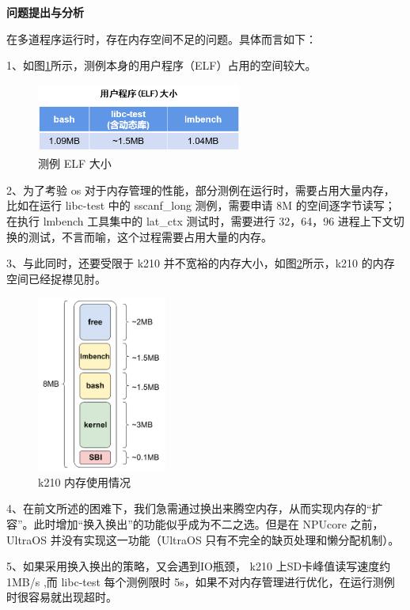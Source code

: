 \textbf{问题提出与分析}

在多道程序运行时，存在内存空间不足的问题。具体而言如下：

1、如图\ref{fig:ELF}所示，测例本身的用户程序（ELF）占用的空间较大。

\begin{figure}[H]
	\centering
	\includegraphics[width=0.6\textwidth]{figures/10-04-测例ELF.jpg}
	\caption{测例 ELF 大小}
	\label{fig:ELF}
\end{figure}

2、为了考验 os 对于内存管理的性能，部分测例在运行时，需要占用大量内存，比如在运行 libc-test 中的 sscanf_long 测例，需要申请 8M 的空间逐字节读写；在执行 lmbench 工具集中的 lat_ctx 测试时，需要进行 32，64，96 进程上下文切换的测试，不言而喻，这个过程需要占用大量的内存。

3、与此同时，还要受限于 k210 并不宽裕的内存大小，如图\ref{fig:k210}所示，k210 的内存空间已经捉襟见肘。

\begin{figure}[h]
	\centering
	\includegraphics[width=0.38\textwidth]{figures/10-04-k210内存空间.jpg}
	\caption{k210 内存使用情况}
	\label{fig:k210}
\end{figure}

4、在前文所述的困难下，我们急需通过换出来腾空内存，从而实现内存的“扩容”。此时增加“换入换出”的功能似乎成为不二之选。但是在 NPUcore 之前， UltraOS 并没有实现这一功能（UltraOS 只有不完全的缺页处理和懒分配机制）。

5、如果采用换入换出的策略，又会遇到IO瓶颈， k210 上SD卡峰值读写速度约 1MB/s ,而 libc-test 每个测例限时 5s，如果不对内存管理进行优化，在运行测例时很容易就出现超时。

